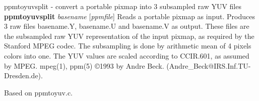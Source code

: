 %

\newpage
%

ppmtoyuvsplit - convert a portable pixmap into 3 subsampled raw YUV files
{\bf ppmtoyuvsplit}
{\it basename}
{\rm [}{\it ppmfile}{\rm ]}
Reads a portable pixmap as input.
Produces 3 raw files basename.Y, basename.U and basename.V as output.
These files are the subsampled raw YUV representation of the input
pixmap, as required by the Stanford MPEG codec. The subsampling is done
by arithmetic mean of 4 pixels colors into one. The YUV values are scaled
according to CCIR.601, as assumed by MPEG.
mpeg(1), ppm(5)
\copyright 1993 by Andre Beck. (Andre\_Beck@IRS.Inf.TU-Dresden.de).
\par
Based on ppmtoyuv.c.
%
 
%

\newpage
%

